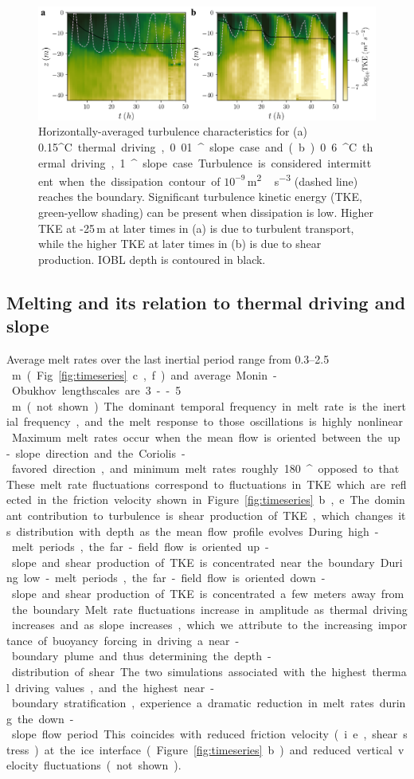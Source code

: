 \documentclass[tc, manuscript]{copernicus}
\begin{document}
\begin{figure}[t]
\includegraphics[width=12cm]{fig6.pdf}
\caption{Horizontally-averaged turbulence characteristics for (a) 0.15\unit{^{\circ}C} thermal driving, 0.01\unit{^{\circ}} slope case and (b) 0.6\unit{^{\circ}C} thermal driving, 1\unit{^{\circ}} slope case. Turbulence is considered intermittent when the dissipation contour of $10^{-9}$\,\unit{m^2\,s^{-3}} (dashed line) reaches the boundary. Significant turbulence kinetic energy (TKE, green-yellow shading) can be present when dissipation is low. Higher TKE at -25\,\unit{m} at later times in (a) is due to turbulent transport, while the higher TKE at later times in (b) is due to shear production. IOBL depth is contoured in black. }
\label{fig:intermittency}
\end{figure}


\subsection{Melting and its relation to thermal driving and slope}
Average melt rates over the last inertial period range from 0.3--2.5\unit\,{m} (Fig. \ref{fig:timeseries}c,f) and average Monin-Obukhov lengthscales are 3--5\,\unit{m} (not shown). The dominant temporal frequency in melt rate is the inertial frequency, and the melt response to those oscillations is highly nonlinear. Maximum melt rates occur when the mean flow is oriented between the up-slope direction and the Coriolis-favored direction, and minimum melt rates roughly 180\unit{^{\circ}} opposed to that. These melt rate fluctuations correspond to fluctuations in TKE which are reflected in the friction velocity shown in Figure \ref{fig:timeseries}b,e. The dominant contribution to turbulence is shear production of TKE, which changes its distribution with depth as the mean flow profile evolves. During high-melt periods, the far-field flow is oriented up-slope and shear production of TKE is concentrated near the boundary. During low-melt periods, the far-field flow is oriented down-slope and shear production of TKE is concentrated a few meters away from the boundary. Melt rate fluctuations increase in amplitude as thermal driving increases and as slope increases, which we attribute to the increasing importance of buoyancy forcing in driving a near-boundary plume and thus determining the depth-distribution of shear. The two simulations associated with the highest thermal driving values, and the highest near-boundary stratification, experience a dramatic reduction in melt rates during the down-slope flow period. This coincides with reduced friction velocity (i.e., shear stress) at the ice interface (Figure \ref{fig:timeseries}b) and reduced vertical velocity fluctuations (not shown). 
\end{document}
